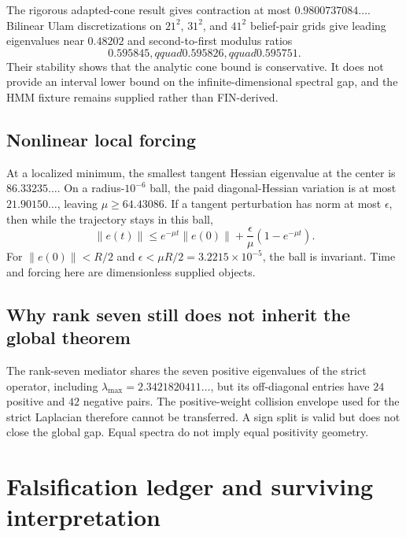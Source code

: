 \documentclass[11pt,a4paper]{article}
\begin{document}
The rigorous adapted-cone result gives contraction at most
$0.9800737084\ldots$.  Bilinear Ulam discretizations on $21^2$, $31^2$, and
$41^2$ belief-pair grids give leading eigenvalues near $0.48202$ and
second-to-first modulus ratios
\[
 0.595845,qquad0.595826,qquad0.595751.
\]
Their stability shows that the analytic cone bound is conservative.  It does
not provide an interval lower bound on the infinite-dimensional spectral gap,
and the HMM fixture remains supplied rather than FIN-derived.

\subsection{Nonlinear local forcing}

At a localized minimum, the smallest tangent Hessian eigenvalue at the center
is $86.33235\ldots$.  On a radius-$10^{-6}$ ball, the paid diagonal-Hessian
variation is at most $21.90150\ldots$, leaving
$\mu\ge64.43086$.  If a tangent perturbation has norm at most $\epsilon$, then
while the trajectory stays in this ball,
\[
 \lVert e(t)\rVert\le e^{-\mu t}\lVert e(0)\rVert+
 \frac{\epsilon}{\mu}(1-e^{-\mu t}).
\]
For $\lVert e(0)\rVert<R/2$ and
$\epsilon<\mu R/2=3.2215\times10^{-5}$, the ball is invariant.  Time and
forcing here are dimensionless supplied objects.

\subsection{Why rank seven still does not inherit the global theorem}

The rank-seven mediator shares the seven positive eigenvalues of the strict
operator, including $\lambda_{\max}=2.3421820411\ldots$, but its off-diagonal
entries have $24$ positive and $42$ negative pairs.  The positive-weight
collision envelope used for the strict Laplacian therefore cannot be
transferred.  A sign split is valid but does not close the global gap.  Equal
spectra do not imply equal positivity geometry.

\section{Falsification ledger and surviving interpretation}
\end{document}
